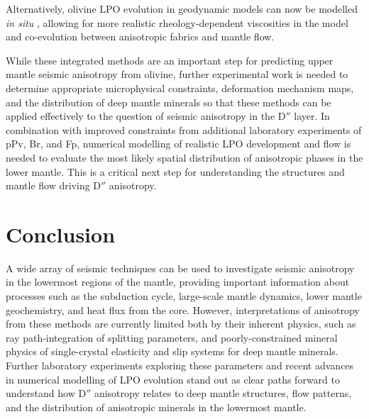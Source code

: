\documentclass{standard}
\begin{document}
Alternatively, olivine LPO evolution in geodynamic models can now be modelled \textit{in situ} \parencite{vedavyasDRexNewTool2026,fratersImplementationUsabilityCrystal2021}, allowing for more realistic rheology-dependent viscosities in the model and co-evolution between anisotropic fabrics and mantle flow.

While these integrated methods are an important step for predicting upper mantle seismic anisotropy from olivine, further experimental work is needed to determine appropriate microphysical constraints, deformation mechanism maps, and the distribution of deep mantle minerals so that these methods can be applied effectively to the question of seismic anisotropy in the D$''$ layer. In combination with improved constraints from additional laboratory experiments of pPv, Br, and Fp, numerical modelling of realistic LPO development and flow is needed to evaluate the most likely spatial distribution of anisotropic phases in the lower mantle. This is a critical next step for understanding the structures and mantle flow driving D$''$ anisotropy.

\section{Conclusion}

A wide array of seismic techniques can be used to investigate seismic anisotropy in the lowermost regions of the mantle, providing important information about processes such as the subduction cycle, large-scale mantle dynamics, lower mantle geochemistry, and heat flux from the core. However, interpretations of anisotropy from these methods are currently limited both by their inherent physics, such as ray path-integration of splitting parameters, and poorly-constrained mineral physics of single-crystal elasticity and slip systems for deep mantle minerals. Further laboratory experiments exploring these parameters and recent advances in numerical modelling of LPO evolution stand out as clear paths forward to understand how D$''$ anisotropy relates to deep mantle structures, flow patterns, and the distribution of anisotropic minerals in the lowermost mantle.

\newpage
\nolinenumbers
\singlespacing
\printbibliography
\end{document}
